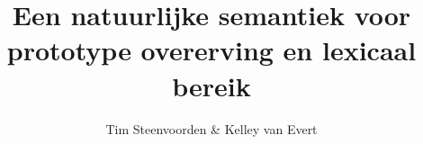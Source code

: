 \documentclass
  [11pt,a4paper,
   twoside=true,
   parskip=half,
   bibliography=totoc]
  {scrbook}
\newcommand{\<}
  {\langle}
\renewcommand{\>}
  {\rangle}
\begin{document}
\frenchspacing%
\raggedbottom%

\begin{titlepage}
  \newlength{\sidlength}
  \settowidth{\sidlength}{4046854}
  \title{Een natuurlijke semantiek voor prototype overerving en lexicaal bereik}
  \author{Tim Steenvoorden \& Kelley van Evert}
  \maketitle
\end{titlepage}

\frontmatter

\tableofcontents


\mainmatter







\backmatter

\raggedright
\nocite{nielsennielsen}

\end{document}
